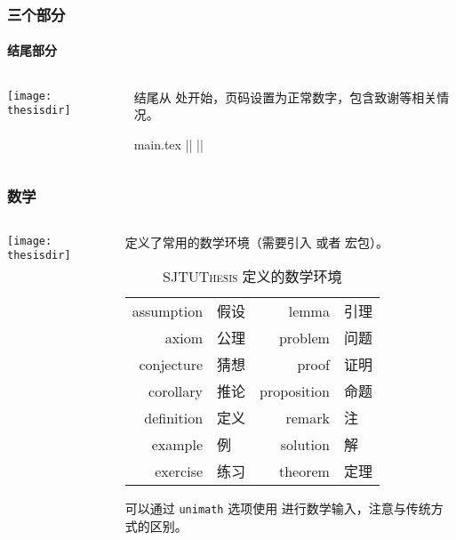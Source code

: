 \begin{frame}[fragile]
  \frametitle{三个部分}
  \framesubtitle{结尾部分}
  \begin{columns}
    \begin{column}{0.4\textwidth}
      \texttt{[image: thesisdir]}
    \end{column}
    \begin{column}{0.6\textwidth}
      结尾从  处开始，页码设置为正常数字，包含致谢等相关情况。
      \begin{codeblock}[firstnumber=71]{main.tex}
|\highlightline|%
|\highlightline|\backmatter






      \end{codeblock}
    \end{column}
  \end{columns}
\end{frame}

\begin{frame}
  \frametitle{数学}
  \begin{columns}
    \begin{column}{0.4\textwidth}
      \texttt{[image: thesisdir]}
    \end{column}
    \begin{column}{0.6\textwidth}
      \SJTUThesis{} 定义了常用的数学环境（需要引入  或者  宏包）。

      \begin{table}
        \centering
        \caption{\textsc{SJTUThesis} 定义的数学环境}
        \footnotesize
        \begin{tabular}{>{\ttfamily}rl|>{\ttfamily}rl}
          \toprule
          assumption  & 假设  & lemma       & 引理 \\
          axiom       & 公理  & problem     & 问题 \\
          conjecture  & 猜想  & proof       & 证明 \\
          corollary   & 推论  & proposition & 命题 \\
          definition  & 定义  & remark      & 注   \\
          example     & 例    & solution    & 解   \\
          exercise    & 练习  & theorem     & 定理 \\
          \bottomrule
        \end{tabular}
      \end{table}

      \SJTUThesis{} 可以通过 \texttt{unimath} 选项使用  进行数学输入，注意与传统方式的区别。
    \end{column}
  \end{columns}
\end{frame}

